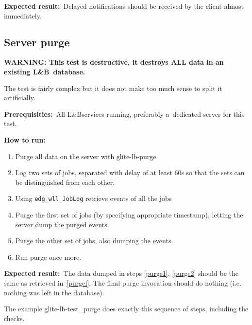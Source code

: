 \documentclass{egee}
\def\LB{L\&B}
\def\req{\noindent\textbf{Prerequisities:}}
\def\how{\noindent\textbf{How to run:}}
\def\result{\noindent\textbf{Expected result:}}
\def\path#1{{\normalfont\textsf{#1}}}
\def\code#1{\texttt{#1}}
\begin{document}
\result\ Delayed notifications should be received by the client almost
immediately.

\subsection{Server purge}

\textbf{WARNING: This test is destructive, it destroys ALL data in an
existing \LB\ database.} 

The test is fairly complex but it does not make too much sense to split it
artificially.

\req\ All \LB services running, preferably a~dedicated server for this test.

\how
\begin{enumerate}
\item Purge all data on the server with \path{glite-lb-purge}
\item Log two sets of jobs, separated with delay of at least 60s so
that the sets can be distinguished from each other.
\item \label{purgel}
Using \code{edg\_wll\_JobLog} retrieve events of all the jobs
\item \label{purge1}
Purge the first set of jobs (by specifying appropriate timestamp),
letting the server dump the purged events.
\item \label{purge2} Purge the other set of jobs, also dumping the events.
\item \label{purge3} Run purge once more.
\end{enumerate}

\result\ The data dumped in steps \ref{purge1}, \ref{purge2} should be the
same as retrieved in~\ref{purgel}. The final purge invocation should
do nothing (i.e. nothing was left in the database).

\begin{hints}
The example \path{glite-lb-test\_purge} does exactly this sequence of steps,
including the checks.
\end{hints}
\end{document}
